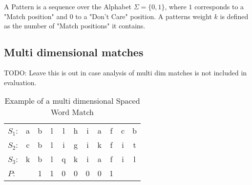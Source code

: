 \begin{mydef}
	A Pattern is a sequence over the Alphabet $\Sigma = \{0, 1\}$, where $1$ corresponds to a "Match position" and $0$ to a "Don't Care" position. A patterns weight $k$ is defined as the number of "Match positions" it contains.
\end{mydef}

\subsection{Multi dimensional matches}

TODO: Leave this is out in case analysis of multi dim matches is not included in evaluation.

\begin{table}[H]
	\centering
	\begin{tabular}{ l c c c c c c c c c c}
		$S_1$: & a&b&l&l&h&i&a&f&c&b \\ 
		$S_2$: & c&b&l&i&g&i&k&f&i&t \\
		$S_3$: & k&b&l&q&k&i&a&f&i&l \\
		$P$: &    &1&1&0&0&0&0&1
	\end{tabular}
	\caption{Example of a multi dimensional Spaced Word Match}
	\label{tab:multi-spaced-word}
\end{table}